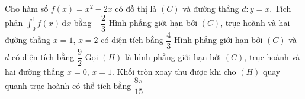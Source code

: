 \begin{ex}%
	Cho hàm số $f(x)=x^2-2x$ có đồ thị là $(C)$ và đường  thẳng $d \colon y=x$.
	 \choiceTF
		{\True Tích phân $\displaystyle\int_0^1f(x)\mathrm{\,d}x$  bằng $-\dfrac{2}{3}$}
		{Hình phẳng giới hạn bởi $(C)$, trục hoành và  hai đường thẳng $x=1$, $x=2$ có diện tích bằng $\dfrac{4}{3}$}
		{\True Hình phẳng giới hạn bởi $(C)$ và $d$ có diện tích bằng  $\dfrac{9}{2}$}
		{\True Gọi $(H)$ là hình phẳng giới hạn bởi $(C)$, trục hoành và hai đường thẳng $x=0$, $x=1$. Khối tròn  xoay thu được khi cho $(H)$ quay quanh trục hoành có thể tích bằng $\dfrac{8\pi}{15}$}
\end{ex}

